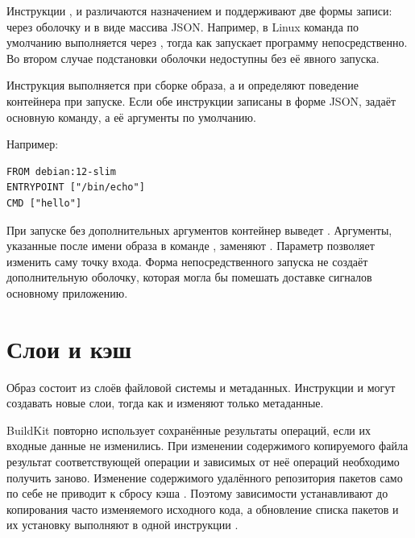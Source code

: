 Инструкции ,  и  различаются назначением и поддерживают две формы записи: через оболочку и в виде массива JSON. Например, в Linux команда  по умолчанию выполняется через , тогда как  запускает программу непосредственно. Во втором случае подстановки оболочки недоступны без её явного запуска.

Инструкция  выполняется при сборке образа, а  и  определяют поведение контейнера при запуске. Если обе инструкции записаны в форме JSON,  задаёт основную команду, а  её аргументы по умолчанию.

\par\addvspace{10pt}\noindent\begin{minipage}{\linewidth}
\setlength{\parindent}{0pt}\noindent\hspace*{1.25cm}Например:\par\kern 10pt
\begin{verbatim}
FROM debian:12-slim
ENTRYPOINT ["/bin/echo"]
CMD ["hello"]
\end{verbatim}
\end{minipage}\par\addvspace{10pt}
При запуске без дополнительных аргументов контейнер выведет . Аргументы, указанные после имени образа в команде , заменяют . Параметр  позволяет изменить саму точку входа. Форма непосредственного запуска не создаёт дополнительную оболочку, которая могла бы помешать доставке сигналов основному приложению.

\section{Слои и кэш}

Образ состоит из слоёв файловой системы и метаданных. Инструкции  и  могут создавать новые слои, тогда как  и  изменяют только метаданные.

BuildKit повторно использует сохранённые результаты операций, если их входные данные не изменились. При изменении содержимого копируемого файла результат соответствующей операции и зависимых от неё операций необходимо получить заново. Изменение содержимого удалённого репозитория пакетов само по себе не приводит к сбросу кэша . Поэтому зависимости устанавливают до копирования часто изменяемого исходного кода, а обновление списка пакетов и их установку выполняют в одной инструкции .

